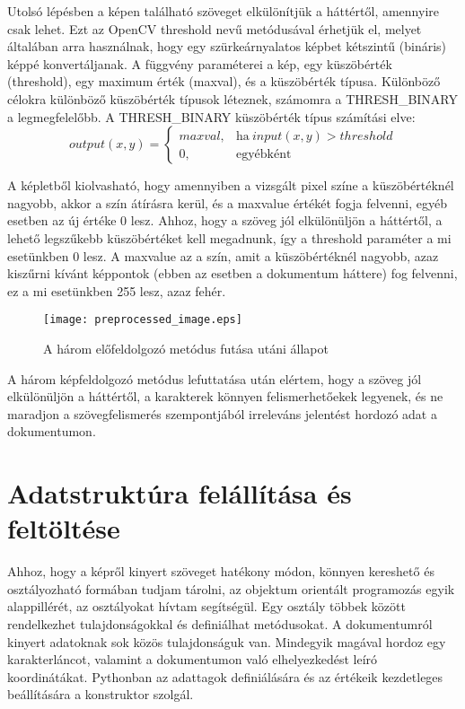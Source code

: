 \documentclass[12pt]{report}
\begin{document}
Utolsó lépésben a képen található szöveget elkülönítjük a háttértől, amennyire csak lehet. Ezt az OpenCV threshold nevű metódusával érhetjük el, melyet általában arra használnak, hogy egy szürkeárnyalatos képbet kétszintű (bináris) képpé konvertáljanak. A függvény paraméterei a kép, egy küszöbérték (threshold), egy maximum érték (maxval), és a küszöbérték típusa.
Különböző célokra különböző küszöbérték típusok léteznek, számomra a THRESH\_BINARY a legmegfelelőbb.
A THRESH\_BINARY küszöbérték típus számítási elve:
\begin{equation*}
output(x,y)=
    \begin{cases}
        maxval, & \text{ha}\ input(x,y)>threshold \\
        0, & \text{egyébként}
    \end{cases}
\end{equation*}

A képletből kiolvasható, hogy amennyiben a vizsgált pixel színe a küszöbértéknél nagyobb, akkor a szín átírásra kerül, és a maxvalue értékét fogja felvenni, egyéb esetben az új értéke 0 lesz.
Ahhoz, hogy a szöveg jól elkülönüljön a háttértől, a lehető legszűkebb küszöbértéket kell megadnunk, így a threshold paraméter a mi esetünkben 0 lesz. A maxvalue az a szín, amit a küszöbértéknél nagyobb, azaz kiszűrni kívánt képpontok (ebben az esetben a dokumentum háttere) fog felvenni, ez a mi esetünkben 255 lesz, azaz fehér.

\begin{figure}[h]
    \centerline{\texttt{[image: preprocessed\_image.eps]}}
    \caption{A három előfeldolgozó metódus futása utáni állapot}
\end{figure}

A három képfeldolgozó metódus lefuttatása után elértem, hogy a szöveg jól elkülönüljön a háttértől, a karakterek könnyen felismerhetőekek legyenek, és ne maradjon a szövegfelismerés szempontjából irreleváns jelentést hordozó adat a dokumentumon.

\section{Adatstruktúra felállítása és feltöltése}

Ahhoz, hogy a képről kinyert szöveget hatékony módon, könnyen kereshető és osztályozható formában tudjam tárolni, az objektum orientált programozás egyik alappillérét, az osztályokat hívtam segítségül. Egy osztály többek között rendelkezhet tulajdonságokkal és definiálhat metódusokat. A dokumentumról kinyert adatoknak sok közös tulajdonságuk van. Mindegyik magával hordoz egy karakterláncot, valamint a dokumentumon való elhelyezkedést leíró koordinátákat. Pythonban az adattagok definiálására és az értékeik kezdetleges beállítására a konstruktor szolgál.
\end{document}
